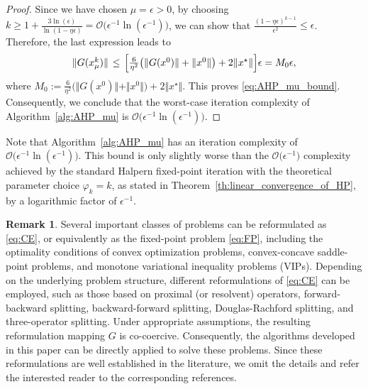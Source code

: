 \documentclass{article}
\theoremstyle{plain}
\theoremstyle{definition}
\newtheorem{remark}{Remark}[section]
\newcommand{\norms}[1]{\Vert#1\Vert}
\newcommand{\0}{\boldsymbol{0}}
\newcommand{\BigOs}[1]{\mathcal{O}\big(#1\big)}
\begin{document}
\begin{proof}
Since we have chosen $\mu = \epsilon > 0$, by choosing $k \geq 1 + \frac{3\ln(\epsilon)}{\ln(1 - \eta\epsilon)} = \BigOs{\epsilon^{-1}\ln(\epsilon^{-1})}$, we can show that $\frac{(1 - \eta\epsilon)^{k-1}}{\epsilon^2} \leq \epsilon$.
Therefore, the last expression leads to
\begin{equation*} 
\arraycolsep=0.2em
\begin{array}{lcl}
\norms{ G(x^k_{\mu}) } & \leq & \Big[\frac{6}{\eta^2}\big(\norms{G(x^0)} + \norms{x^0}\big) + 2\norms{x^{\star}}\Big] \epsilon = M_0\epsilon,
\end{array}
\end{equation*}
where $M_0 := \frac{6}{\eta^2}\big(\norms{G(x^0)} + \norms{x^0}\big) + 2\norms{x^{\star}}$.
This proves \eqref{eq:AHP_mu_bound}.
Consequently, we conclude that the worst-case iteration complexity of Algorithm~\ref{alg:AHP_mu} is $\BigOs{\epsilon^{-1}\ln(\epsilon^{-1})}$.
\end{proof}

Note that Algorithm~\ref{alg:AHP_mu} has an iteration complexity of $\BigOs{\epsilon^{-1}\ln(\epsilon^{-1})}$.
This bound is only slightly worse than the $\BigOs{\epsilon^{-1}}$ complexity achieved by the standard Halpern fixed-point iteration with the theoretical parameter choice $\varphi_k = k$, as stated in Theorem~\ref{th:linear_convergence_of_HP}, by a logarithmic factor of $\epsilon^{-1}$.

\begin{remark}\label{re:generalization}
Several important classes of problems can be reformulated as \eqref{eq:CE}, or equivalently as the fixed-point problem \eqref{eq:FP}, including the optimality conditions of convex optimization problems, convex-concave saddle-point problems, and monotone variational inequality problems (VIPs). 
Depending on the underlying problem structure, different reformulations of \eqref{eq:CE} can be employed, such as those based on proximal (or resolvent) operators, forward-backward splitting, backward-forward splitting, Douglas-Rachford splitting, and three-operator splitting. 
Under appropriate assumptions, the resulting reformulation mapping $G$ is co-coercive. Consequently, the algorithms developed in this paper can be directly applied to solve these problems. 
Since these reformulations are well established in the literature, we omit the details and refer the interested reader to the corresponding references.
\end{remark}

\end{document}
